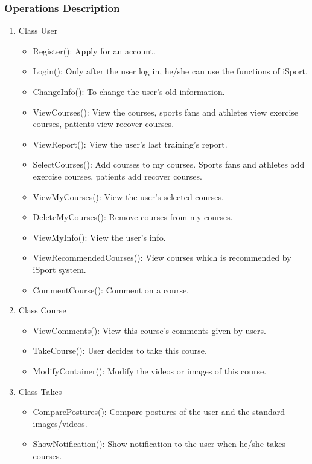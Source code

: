 \documentclass[16pt]{scrreprt}
\begin{document}
\subsubsection{Operations Description}
\begin{enumerate}
    \item Class User
    \begin{itemize}
        \item Register(): Apply for an account.
        \item Login(): Only after the user log in, he/she can use the functions of iSport.
        \item ChangeInfo(): To change the user's old information.
        \item ViewCourses(): View the courses, sports fans and athletes view exercise courses, patients view recover courses.
        \item ViewReport(): View the user's last training's report.
        \item SelectCourses(): Add courses to my courses. Sports fans and athletes add exercise courses, patients add recover courses.
        \item ViewMyCourses(): View the user's selected courses.
        \item DeleteMyCourses(): Remove courses from my courses.
        \item ViewMyInfo():  View the user's info.
        \item ViewRecommendedCourses(): View courses which is recommended by iSport system.
        \item CommentCourse(): Comment on a course.
    \end{itemize}
    \item Class Course
    \begin{itemize}
        \item ViewComments(): View this course's comments given by users.
        \item TakeCourse(): User decides to take this course.
        \item ModifyContainer(): Modify the videos or images of this course.
    \end{itemize}
    \item Class Takes
    \begin{itemize}
        \item ComparePostures(): Compare postures of the user and the standard images/videos.
        \item ShowNotification(): Show notification to the user when he/she takes courses.

\end{itemize}
\end{enumerate}
\end{document}
